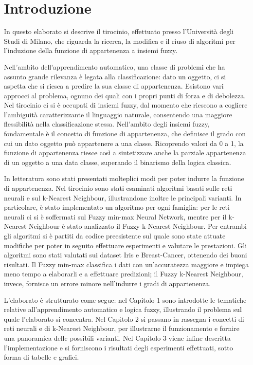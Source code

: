 \documentclass[11pt,  oneside, openany]{book}
\begin{document}
    \tableofcontents

	\chapter*{Introduzione}
In questo elaborato si descrive il tirocinio, effettuato presso l'Università degli Studi di Milano, che riguarda la ricerca, la modifica e il riuso di algoritmi per l'induzione della funzione di appartenenza a insiemi fuzzy. 

Nell'ambito dell'apprendimento automatico, una classe di problemi che ha assunto grande rilevanza è legata alla classificazione: dato un oggetto, ci si aspetta che si riesca a predire la sua classe di appartenenza. Esistono vari approcci al problema, ognuno dei quali con i propri punti di forza e di debolezza. Nel tirocinio ci si è occupati di insiemi fuzzy, dal momento che riescono a cogliere l'ambiguità caratterizzante il linguaggio naturale, consentendo una maggiore flessibilità nella classificazione stessa. Nell'ambito degli insiemi fuzzy, fondamentale è il concetto di funzione di appartenenza, che definisce il grado con cui un dato oggetto può appartenere a una classe. Ricoprendo valori da 0 a 1, la funzione di appartenenza riesce così a sintetizzare anche la parziale appartenenza di un oggetto a una data classe, superando il binarismo della logica classica. 

In letteratura sono stati presentati molteplici modi per poter indurre la funzione di appartenenza. Nel tirocinio sono stati esaminati algoritmi basati sulle reti neurali e sul k-Nearest Neighbour, illustrandone inoltre le principali varianti. In particolare, è stato implementato un algoritmo per ogni famiglia: per le reti neurali ci si è soffermati sul Fuzzy min-max Neural Network, mentre per il k-Nearest Neighbour è stato analizzato il Fuzzy k-Nearest Neighbour. Per entrambi gli algoritmi si è partiti da codice preesistente sul quale sono state attuate modifiche per poter in seguito effettuare esperimenti e valutare le prestazioni. Gli algoritmi sono stati valutati sui dataset Iris e Breast-Cancer, ottenendo dei buoni risultati. Il Fuzzy min-max classifica i dati con un'accuratezza maggiore e impiega meno tempo a elaborarli e a effettuare predizioni; il Fuzzy k-Nearest Neighbour, invece, fornisce un errore minore nell'indurre i gradi di appartenenza. 

L'elaborato è strutturato come segue: nel Capitolo 1 sono introdotte le tematiche relative all'apprendimento automatico e logica fuzzy, illustrando il problema sul quale l'elaborato si concentra. Nel Capitolo 2 si passano in rassegna i concetti di reti neurali e di k-Nearest Neighbour, per illustrarne il funzionamento e fornire una panoramica delle possibili varianti. Nel Capitolo 3 viene infine descritta l'implementazione e si forniscono i risultati degli esperimenti effettuati, sotto forma di tabelle e grafici. 
\end{document}
